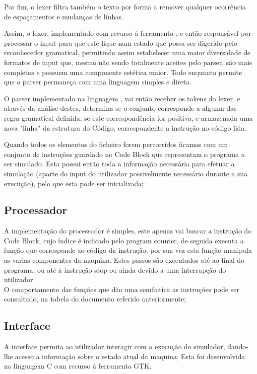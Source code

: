\documentclass{report}
\begin{document}
Por fim, o lexer filtra também o texto por forma a remover qualquer ocorrência de espaçamentos e mudanças de linhas.

\quad Assim, o lexer, implementado com recurso à ferramenta {\FLEX}, e então responsável por processar o input para que este fique num estado que possa ser digerido pelo reconhecedor gramatical,
permitindo assim estabelecer uma maior diversidade de formatos de input que, mesmo não sendo totalmente aceites pelo
parser, são mais completos e possuem uma componente estética maior. Todo enquanto permite que o parser permaneça com
uma linguagem simples e direta.

\quad O parser implementado na linguagem {\YACC}, vai então receber os tokens do lexer, e através da análise destes, determina se o conjunto
corresponde a alguma das regra gramatical definida, se este correspondência for positiva, e armazenada
uma nova "linha" da estrutura do Código, correspondente a instrução no código lida.

\quad Quando todos os elementos do ficheiro forem percorridos ficamos com um conjunto de instruções guardado no Code Block que
representam o programa a ser simulado. Esta possui então toda a informação necessária para
efetuar a simulação (aparte do input do utilizador possivelmente necessário
durante a sua execução), pelo que esta pode ser inicializada;

\subsection{Processador}
\quad A implementação do processador é simples, este apenas vai buscar a instrução do Code Block,
cujo índice é indicado pelo program counter, de seguida executa a função que corresponde ao código da instrução,
por sua vez esta função manipula as varias componentes da maquina.
Estes passos são executados até ao final do programa, ou até à instrução stop ou ainda devido a uma interrupção do utilizador.\\
\quad O comportamento das funções que dão uma semântica as instruções pode ser consultado, na tabela do documento referido anteriormente;


\subsection{Interface}
\quad A interface permita ao utilizador interagir com a execução do simulador, dando-lhe acesso a informação sobre o estado atual da maquina;
Esta foi desenvolvida na linguagem C com recurso à ferramenta GTK.
\end{document}
